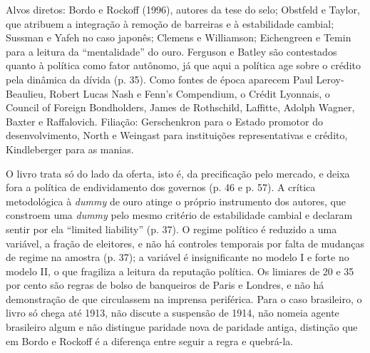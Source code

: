 Alvos diretos: Bordo e Rockoff (1996), autores da tese do selo; Obstfeld e
Taylor, que atribuem a integração à remoção de barreiras e à estabilidade
cambial; Sussman e Yafeh no caso japonês; Clemens e Williamson; Eichengreen e
Temin para a leitura da ``mentalidade'' do ouro. Ferguson e Batley são
contestados quanto à política como fator autônomo, já que aqui a política age
sobre o crédito pela dinâmica da dívida (p. 35). Como fontes de época
aparecem Paul Leroy-Beaulieu, Robert Lucas Nash e Fenn's Compendium, o Crédit
Lyonnais, o Council of Foreign Bondholders, James de Rothschild, Laffitte,
Adolph Wagner, Baxter e Raffalovich. Filiação: Gerschenkron para o Estado
promotor do desenvolvimento, North e Weingast para instituições
representativas e crédito, Kindleberger para as manias.

O livro trata só do lado da oferta, isto é, da precificação pelo mercado, e
deixa fora a política de endividamento dos governos (p. 46 e p. 57). A crítica
metodológica à \emph{dummy} de ouro atinge o próprio instrumento dos autores,
que constroem uma \emph{dummy} pelo mesmo critério de estabilidade cambial e
declaram sentir por ela ``limited liability'' (p. 37). O regime político é
reduzido a uma variável, a fração de eleitores, e não há controles temporais
por falta de mudanças de regime na amostra (p. 37); a variável é insignificante
no modelo I e forte no modelo II, o que fragiliza a leitura da reputação
política. Os limiares de 20 e 35 por cento são regras de bolso de banqueiros de
Paris e Londres, e não há demonstração de que circulassem na imprensa
periférica. Para o caso brasileiro, o livro só chega até 1913, não discute a
suspensão de 1914, não nomeia agente brasileiro algum e não distingue paridade
nova de paridade antiga, distinção que em Bordo e Rockoff é a diferença entre
seguir a regra e quebrá-la.

